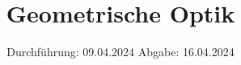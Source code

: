 

\subject{V408}
\title{Geometrische Optik}
\date{%
  Durchführung: 09.04.2024
  \hspace{3em}
  Abgabe: 16.04.2024
}



\maketitle
\thispagestyle{empty}
\tableofcontents
\newpage






\printbibliography{}


